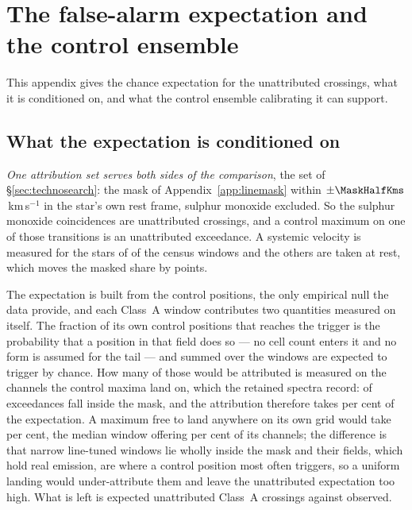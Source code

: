 \section{The false-alarm expectation and the control ensemble}
\label{app:falsealarm}

This appendix gives the chance expectation for the unattributed crossings,
what it is conditioned on, and what the control ensemble calibrating it can
support.

\subsection{What the expectation is conditioned on}

\emph{One attribution set serves both sides of the comparison}, the set of
\S\ref{sec:technosearch}: the mask of Appendix~\ref{app:linemask} within
$\pm\MaskHalfKms$\,km\,s$^{-1}$ in the star's own rest frame, sulphur monoxide
excluded. So the \MkNSODecide{} sulphur monoxide coincidences are unattributed
crossings, and a control maximum on one of those transitions is an
unattributed exceedance. A systemic velocity is measured for the stars of
\CeNVsys{} of the census windows and the others are taken at rest, which moves
the masked share by \CeVsysSensPct{} points.

The expectation is built from the control positions, the only empirical null
the data provide, and each Class~A window contributes two quantities
measured on itself. The fraction of its own \NCtrl{} control positions that
reaches the trigger is the probability that a position in that field does so
--- no cell count enters it and no form is assumed for the tail --- and
summed over the windows \CeExpTrig{} are expected to trigger by chance. How
many of those would be attributed is measured on the channels the control
maxima land on, which the retained spectra record: \CeNExcAttr{} of
\CeNExc{} exceedances fall inside the mask, and the attribution therefore
takes \CeMaskPct{} per cent of the expectation. A maximum free to land
anywhere on its own grid would take \CeUnifPct{} per cent, the median window
offering \CeMaskPctMed{} per cent of its channels; the difference is that
\CeNFullMask{} narrow line-tuned windows lie wholly inside the mask and
their fields, which hold real emission, are where a control position most
often triggers, so a uniform landing would under-attribute them and leave
the unattributed expectation too high. What is
left is \CeExp{} expected unattributed Class~A crossings against \CeObs{}
observed.

